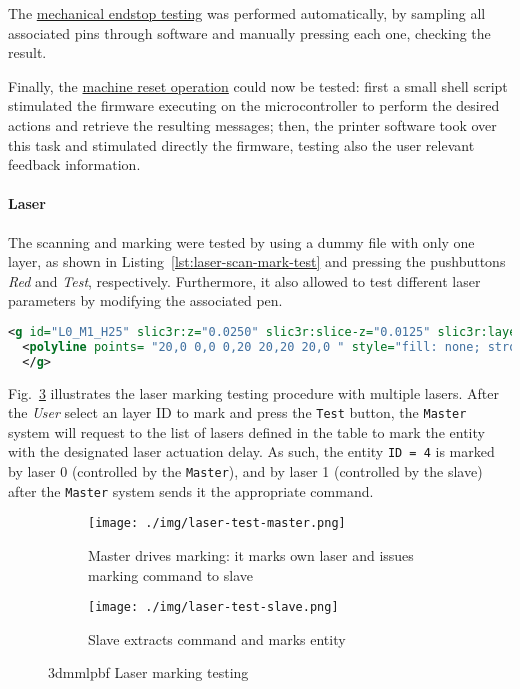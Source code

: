 The \underline{mechanical endstop testing} was performed automatically, by
sampling all associated pins through software and manually pressing each one,
checking the result.

Finally, the \underline{machine reset operation} could now be tested: first a
small shell script stimulated the firmware executing on the microcontroller to
perform the desired actions and retrieve the resulting messages; then, the
printer software took over this task and stimulated directly the firmware,
testing also the user relevant feedback information.

\paragraph{Laser}
The scanning and marking were tested by using a dummy file with only one layer,
as shown in Listing~\ref{lst:laser-scan-mark-test} and pressing the pushbuttons
\emph{Red} and \emph{Test}, respectively. Furthermore, it also allowed to test
different laser parameters by modifying the associated pen.

\begin{lstlisting}[language=xml, basicstyle=\scriptsize, caption=One layer manufacturing file to test
  the laser, label=lst:laser-scan-mark-test]
  <g id="L0_M1_H25" slic3r:z="0.0250" slic3r:slice-z="0.0125" slic3r:layer-height="0.0250" slic3r:mat="1">
  <polyline points= "20,0 0,0 0,20 20,20 20,0 " style="fill: none; stroke: white; stroke-width: 0.1; fill-type: evenodd" slic3r:type="" />
  </g>
\end{lstlisting}

Fig.~\ref{fig:laser-mark-test} illustrates the laser marking testing
procedure with multiple lasers. After the \emph{User} select an layer ID to mark and press the
\texttt{Test} button, the \texttt{Master} system will request to the list of
lasers defined in the table to mark the entity with the designated laser
actuation delay.
As such, the entity \texttt{ID = 4} is marked by laser 0
(controlled by the \texttt{Master}), and by laser 1 (controlled by the slave)
after the \texttt{Master} system sends it the appropriate command.

\begin{figure}[htb!]
  \centering
  \begin{subfigure}[t]{1.0\textwidth}
    \texttt{[image: ./img/laser-test-master.png]}
  \caption{Master drives marking: it marks own laser and issues marking command to slave}%
  \label{fig:laser-mark-test-1}
  \end{subfigure}
%
  \begin{subfigure}[t]{1.0\textwidth}
    \texttt{[image: ./img/laser-test-slave.png]}
  \caption{Slave extracts command and marks entity}%
  \label{fig:laser-mark-test-2}
  \end{subfigure}
  \caption{\gls{3dmmlpbf} Laser marking testing}%
  \label{fig:laser-mark-test}
\end{figure}

